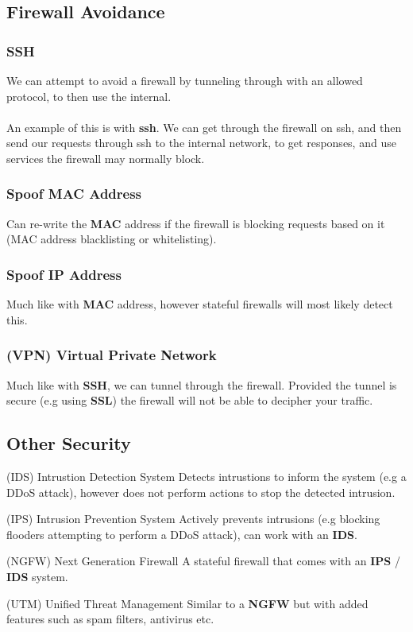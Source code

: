 \subsection{Firewall Avoidance}
\subsubsection{SSH}
We can attempt to avoid a firewall by tunneling through with an allowed protocol, to then use the internal.
\\
\\ An example of this is with \textbf{ssh}. We can get through the firewall on ssh, and then send our requests through ssh to the internal network, to get responses, and use services the firewall may normally block.

\subsubsection{Spoof MAC Address}
Can re-write the \textbf{MAC} address if the firewall is blocking requests based on it (MAC address blacklisting or whitelisting).

\subsubsection{Spoof IP Address}
Much like with \textbf{MAC} address, however stateful firewalls will most likely detect this.

\subsubsection{(VPN) Virtual Private Network}
Much like with \textbf{SSH}, we can tunnel through the firewall. Provided the tunnel is secure (e.g using \textbf{SSL}) the firewall will not be able to decipher your traffic.

\subsection{Other Security}
\begin{definitionbox}{(IDS) Intrustion Detection System}
    Detects intrustions to inform the system (e.g a DDoS attack), however does not perform actions to stop the detected intrusion.
\end{definitionbox}
\begin{definitionbox}{(IPS) Intrusion Prevention System}
    Actively prevents intrusions (e.g blocking  flooders attempting to perform a DDoS attack), can work with an \textbf{IDS}.
\end{definitionbox}
\begin{definitionbox}{(NGFW) Next Generation Firewall}
    A stateful firewall that comes with an \textbf{IPS} / \textbf{IDS} system.
\end{definitionbox}
\begin{definitionbox}{(UTM) Unified Threat Management}
    Similar to a \textbf{NGFW} but with added features such as spam filters, antivirus etc.
\end{definitionbox}
